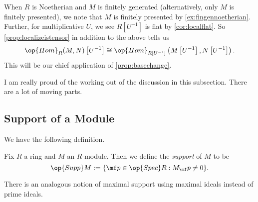 \begin{remark}[Nir] \label{rem:applybasechange}
	When $R$ is Noetherian and $M$ is finitely generated (alternatively, only $M$ is finitely presented), we note that $M$ is finitely presented by \autoref{ex:fingennoetherian}. Further, for multiplicative $U$, we see $R\left[U^{-1}\right]$ is flat by \autoref{cor:localflat}. So \autoref{prop:localizeistensor} in addition to the above tells us
	\[\op{Hom}_R(M,N)\left[U^{-1}\right]\cong\op{Hom}_{R\left[U^{-1}\right]}\left(M\left[U^{-1}\right],N\left[U^{-1}\right]\right).\]
	This will be our chief application of \autoref{prop:basechange}.
\end{remark}
\begin{remark}[Nir]
	I am really proud of the working out of the discussion in this subsection. There are a lot of moving parts.
\end{remark}

\subsection{Support of a Module}
We have the following definition.
\begin{definition}[Support]
	Fix $R$ a ring and $M$ an $R$-module. Then we define the \textit{support} of $M$ to be
	\[\op{Supp}M:=\{\mf p\in\op{Spec}R:M_\mf p\ne0\}.\]
\end{definition}
There is an analogous notion of maximal support using maximal ideals instead of prime ideals.


